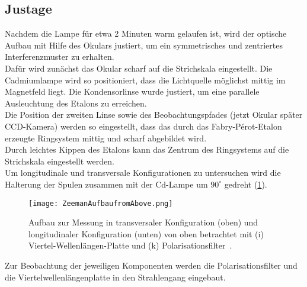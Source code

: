 \subsection{Justage}
Nachdem die Lampe für etwa 2 Minuten warm gelaufen ist, wird der optische Aufbau mit Hilfe des Okulars justiert, um ein symmetrisches und zentriertes Interferenzmuster zu erhalten.\\
Dafür wird zunächst das Okular scharf auf die Strichskala eingestellt. Die Cadmiumlampe wird so positioniert, dass die Lichtquelle möglichst mittig im Magnetfeld liegt. Die Kondensorlinse wurde justiert, um eine parallele Ausleuchtung des Etalons zu erreichen.\\
Die Position der zweiten Linse sowie des Beobachtungspfades (jetzt Okular später CCD-Kamera) werden so eingestellt, dass das durch das Fabry-Pérot-Etalon erzeugte Ringsystem mittig und scharf abgebildet wird.\\
Durch leichtes Kippen des Etalons kann das Zentrum des Ringsystems auf die Strichskala eingestellt werden.
\vspace{0.3cm}\\
Um longitudinale und transversale Konfigurationen zu untersuchen wird die Halterung der Spulen zusammen mit der Cd-Lampe um $90^{\circ}$ gedreht (\cref{fig:aufbau_zeemann_above}).\\
\begin{figure}[H]
    \centering
    \texttt{[image: ZeemanAufbaufromAbove.png]}
    \caption[Longitudinale und Transversale Konfiguration Zeemann-Effekt]{Aufbau zur Messung in transversaler Konfiguration (oben) und longitudinaler Konfiguration (unten) von oben betrachtet mit (i) Viertel-Wellenlängen-Platte und (k) Polarisationsfilter~\cite{LD}.}\label{fig:aufbau_zeemann_above}
\end{figure}
\noindent Zur Beobachtung der jeweiligen Komponenten werden die Polarisationsfilter und die Viertelwellenlängenplatte in den Strahlengang eingebaut.\\
%
%

